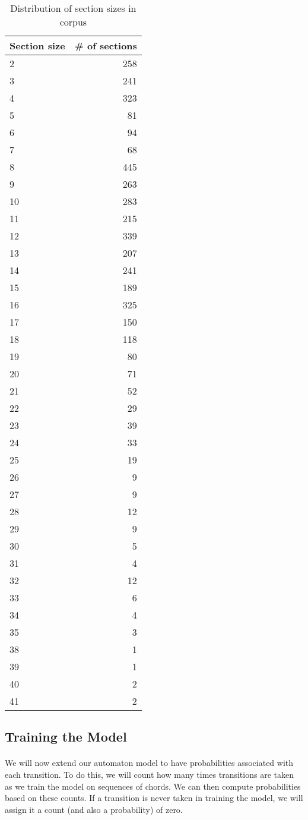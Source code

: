 \documentclass[]{article}
\begin{document}
\begin{table}
	\centering
	\caption{Distribution of section sizes in corpus}
	\label{fig:sections}
	\begin{tabular}{l|r}
		Section size & \# of sections \\
		\hline
		2 & 258 \\
		3 & 241 \\
		4 & 323 \\
		5 & 81 \\
		6 & 94 \\
		7 & 68 \\
		8 & 445 \\
		9 & 263 \\
		10 & 283 \\
		11 & 215 \\
		12 & 339 \\
		13 & 207 \\
		14 & 241 \\
		15 & 189 \\
		16 & 325 \\
		17 & 150 \\
		18 & 118 \\
		19 & 80 \\
		20 & 71 \\
		21 & 52 \\
		22 & 29 \\
		23 & 39 \\
		24 & 33 \\
		25 & 19 \\
		26 & 9 \\
		27 & 9 \\
		28 & 12 \\
		29 & 9 \\
		30 & 5 \\
		31 & 4 \\
		32 & 12 \\
		33 & 6 \\
		34 & 4 \\
		35 & 3 \\
		38 & 1 \\
		39 & 1 \\
		40 & 2 \\
		41 & 2
	\end{tabular}
\end{table}

\subsection{Training the Model}
\paragraph{} We will now extend our automaton model to have probabilities associated with each transition.  To do this, we will count how many times transitions are taken as we train the model on sequences of chords.  We can then compute probabilities based on these counts.  If a transition is never taken in training the model, we will assign it a count (and also a probability) of zero.
\end{document}
